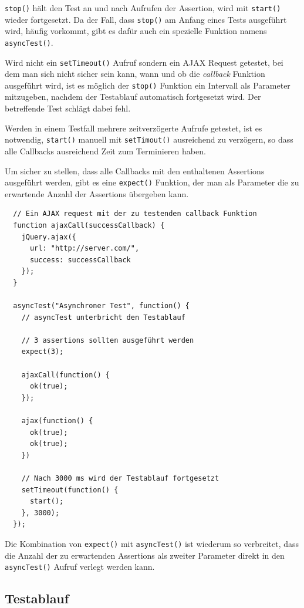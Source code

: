 \documentclass[11pt, a4paper]{article}
\begin{document}
\texttt{stop()} hält den Test an und nach Aufrufen der Assertion, wird
mit \texttt{start()} wieder fortgesetzt. Da der Fall, dass \texttt{stop()} am
Anfang eines Tests ausgeführt wird, häufig vorkommt, gibt es dafür auch ein
spezielle Funktion namens \texttt{asyncTest()}.

Wird nicht ein \texttt{setTimeout()} Aufruf sondern ein AJAX Request
getestet, bei dem man sich nicht sicher sein kann, wann und ob die
\emph{callback} Funktion ausgeführt wird, ist es möglich der \texttt{stop()}
Funktion ein Intervall als Parameter mitzugeben, nachdem der Testablauf
automatisch fortgesetzt wird. Der betreffende Test schlägt dabei fehl.

Werden in einem Testfall mehrere zeitverzögerte Aufrufe getestet, ist es
notwendig, \texttt{start()} manuell mit \texttt{setTimout()} ausreichend zu
verzögern, so dass alle Callbacks ausreichend Zeit zum Terminieren haben.

Um sicher zu stellen, dass alle Callbacks mit den enthaltenen
Assertions ausgeführt werden, gibt es eine \texttt{expect()} Funktion,
der man als Parameter die zu erwartende Anzahl der Assertions übergeben
kann.

\begin{verbatim}
  // Ein AJAX request mit der zu testenden callback Funktion
  function ajaxCall(successCallback) {
    jQuery.ajax({
      url: "http://server.com/",
      success: successCallback
    });
  }

  asyncTest("Asynchroner Test", function() {
    // asyncTest unterbricht den Testablauf

    // 3 assertions sollten ausgeführt werden
    expect(3);

    ajaxCall(function() {
      ok(true);
    });

    ajax(function() {
      ok(true);
      ok(true);
    })

    // Nach 3000 ms wird der Testablauf fortgesetzt
    setTimeout(function() {
      start();
    }, 3000);
  });
\end{verbatim}

Die Kombination von \texttt{expect()} mit \texttt{asyncTest()} ist wiederum so
verbreitet, dass die Anzahl der zu erwartenden Assertions als zweiter
Parameter direkt in den \texttt{asyncTest()} Aufruf verlegt werden kann.

\subsection{Testablauf}
\end{document}
